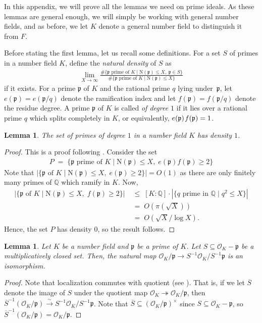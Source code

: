 \documentclass[11pt]{amsart}
\newtheorem{lemma}[theorem]{Lemma}
\theoremstyle{remark}
\newcommand\fr[1]{\mathfrak{#1}}
\newcommand\ov[1]{\overline{#1}}
\newcommand{\rat}{\mathbb{Q}}
\newcommand{\clo}{\mathcal{O}}
\newcommand{\simarrow}{\xrightarrow{\;\sim\;}}
\newcommand{\eq}{\;=\;}
\def\thin{{\hskip 1pt}}
\newcommand{\hash}{\texttt{\#}}
\newcommand{\N}{\mathrm{N}}
\begin{document}
In this appendix, we will prove all the lemmas we need on prime ideals. As these lemmas are general enough, we will simply be working with general number fields, and as before, we let $K$ denote a general number field to distinguish it from $F$. 

Before stating the first lemma, let us recall some definitions. For a set $S$ of primes in a number field $K$, define the \textit{natural density} of $S$ as
\begin{align*}
    \lim_{X\rightarrow\infty}\frac{\hash\{\fr{p}\text{ prime of }K\mid\N(\fr{p})\leq X,\;\fr{p}\in S\}}{\hash\{\fr{p}\text{ prime of }K\mid\N(\fr{p})\leq X\}}
\end{align*}
if it exists. For a prime $\fr{p}$ of $K$ and the rational prime $q$ lying under~$\fr{p}$, let $e(\fr{p})=e(\fr{p}/q)$ denote the ramification index and let $f(\fr{p})=f(\fr{p}/q)$ denote the residue degree. A prime $\fr{p}$ of $K$ is called \textit{of degree $1$} if it lies over a rational prime $q$ which splits completely in $K$, or equivalently, $e(\fr{p})\thin f(\fr{p})=1$.

\begin{lemma}
\label{deg1}
The set of primes of degree $1$ in a number field $K$ has density $1$.
\end{lemma}
\begin{proof}
This is a proof following \cite[Lemma~1]{ziegler}. Consider the set
\begin{align*}
    P\eq \{\fr{p}\text{ prime of }K\mid\N(\fr{p})\leq X,\; e(\fr{p})f(\fr{p})\geq2\}
\end{align*}
Note that $|\{\fr{p}\text{ of }K\mid\N(\fr{p})\leq X,\; e(\fr{p})\geq2\}|=O(1)$ as there are only finitely many primes of $\rat$ which ramify in $K$. Now, 
\begin{align*}
        |\{\fr{p}\text{ of }K\mid\N(\fr{p})\leq X,\; f(\fr{p})\geq2\}|&\;\leq\;[K:\rat]\cdot|\{q\text{ prime in }\rat\mid q^2\leq X\}| \\
        &\eq O(\pi(\sqrt{X}))  \\
        &\eq O(\sqrt{X}/\log X).
\end{align*}
Hence, the set $P$ has density $0$, so the result follows.
\end{proof}

\begin{lemma}
\label{local-quotient}
Let $K$ be a number field and $\fr{p}$ be a prime of $K$. Let $S\subseteq\clo_K-\fr{p}$ be a multiplicatively closed set. Then, the natural map $\clo_K/\fr{p}\rightarrow S^{-1}\clo_K/S^{-1}\fr{p}$ is an isomorphism.
\end{lemma}
\begin{proof}
Note that localization commutes with quotient (see \cite[\href{https://stacks.math.columbia.edu/tag/00CT}{Proposition 10.9.14 (00CT)}]{stacks-project}). That is, if we let $\ov{S}$ denote the image of $S$ under the quotient map $\clo_K\twoheadrightarrow\clo_K/\fr{p}$, then $\ov{S}^{-1}(\clo_K/\fr{p})\simarrow S^{-1}\clo_K/S^{-1}\fr{p}$. Note that $\ov{S}\subseteq(\clo_K/\fr{p})^\times$ since $S\subseteq\clo_K-\fr{p}$, so $\ov{S}^{-1}(\clo_K/\fr{p})=\clo_K/\fr{p}$.
\end{proof}
\end{document}
